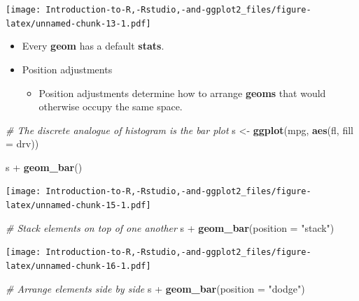\documentclass[]{book}
\newenvironment{Shaded}{\begin{snugshade}}{\end{snugshade}}
\newcommand{\KeywordTok}[1]{\textcolor[rgb]{0.13,0.29,0.53}{\textbf{{#1}}}}
\newcommand{\DataTypeTok}[1]{\textcolor[rgb]{0.13,0.29,0.53}{{#1}}}
\newcommand{\StringTok}[1]{\textcolor[rgb]{0.31,0.60,0.02}{{#1}}}
\newcommand{\CommentTok}[1]{\textcolor[rgb]{0.56,0.35,0.01}{\textit{{#1}}}}
\newcommand{\NormalTok}[1]{{#1}}
\providecommand{\tightlist}{%
  \setlength{\itemsep}{0pt}\setlength{\parskip}{0pt}}
\begin{document}
\texttt{[image: Introduction-to-R,-Rstudio,-and-ggplot2\_files/figure-latex/unnamed-chunk-13-1.pdf]}

\begin{itemize}
\item
  Every \textbf{geom} has a default \textbf{stats}.
\item
  Position adjustments

  \begin{itemize}
  \tightlist
  \item
    Position adjustments determine how to arrange \textbf{geoms} that
    would otherwise occupy the same space.
  \end{itemize}
\end{itemize}

\begin{Shaded}
\begin{Highlighting}[]
\CommentTok{# The discrete analogue of histogram is the bar plot}
\NormalTok{s <-}\StringTok{ }\KeywordTok{ggplot}\NormalTok{(mpg, }\KeywordTok{aes}\NormalTok{(fl, }\DataTypeTok{fill =} \NormalTok{drv))}
\end{Highlighting}
\end{Shaded}

\begin{Shaded}
\begin{Highlighting}[]
\NormalTok{s +}\StringTok{ }\KeywordTok{geom_bar}\NormalTok{()}
\end{Highlighting}
\end{Shaded}

\texttt{[image: Introduction-to-R,-Rstudio,-and-ggplot2\_files/figure-latex/unnamed-chunk-15-1.pdf]}

\begin{Shaded}
\begin{Highlighting}[]
\CommentTok{# Stack elements on top of one another}
\NormalTok{s +}\StringTok{ }\KeywordTok{geom_bar}\NormalTok{(}\DataTypeTok{position =} \StringTok{"stack"}\NormalTok{)}
\end{Highlighting}
\end{Shaded}

\texttt{[image: Introduction-to-R,-Rstudio,-and-ggplot2\_files/figure-latex/unnamed-chunk-16-1.pdf]}

\begin{Shaded}
\begin{Highlighting}[]
\CommentTok{# Arrange elements side by side}
\NormalTok{s +}\StringTok{ }\KeywordTok{geom_bar}\NormalTok{(}\DataTypeTok{position =} \StringTok{"dodge"}\NormalTok{)}
\end{Highlighting}
\end{Shaded}
\end{document}
